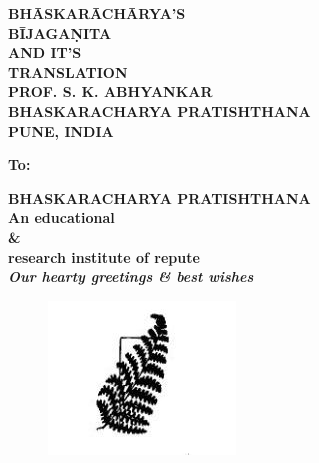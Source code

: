 \documentclass[]{article}
\date{}
\begin{document}
\thispagestyle{empty}
\Large

\begin{center}
\textbf{	
\Huge	BHĀSKARĀCHĀRYA'S}\\
\vspace{15pt}
\textbf{\Huge BĪJAGAṆITA}\\
\vspace{15pt}
\textbf{\huge AND IT'S}\\
\vspace{20pt}
\textbf{\Huge TRANSLATION}\\
\vspace{100pt}
\textbf{PROF. S. K. ABHYANKAR}\\
\vspace{220pt}
\textbf{BHASKARACHARYA PRATISHTHANA}\\
\textbf{PUNE, INDIA}\\
\end{center}
\newpage
\thispagestyle{empty}
\Large
{\textbf{To:} }
\vspace{10pt}
\begin{center}
\textbf{	
	BHASKARACHARYA PRATISHTHANA}\\

\vspace{20pt}	
\textbf{	An educational}\\
\vspace{10pt}	
\textbf{	\&} \\
\vspace{10pt}	
\textbf{	research institute of repute }\\
	
	\vspace{30pt}
\textbf{\textit{	Our hearty greetings \& best wishes}}\\
	\vspace{20pt}
	
\end{center}
\begin{figure}[h!]
\centering
\includegraphics{Capture}
\end{figure}
\end{document}
